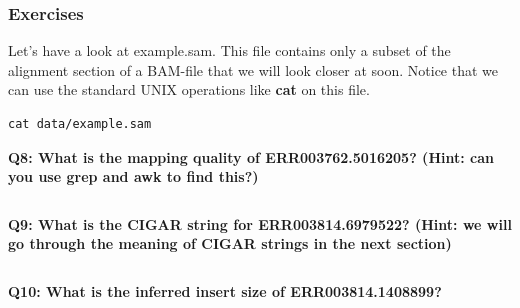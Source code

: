 \documentclass[11pt]{article}
\makeatletter
\newcommand{\boxspacing}{\kern\kvtcb@left@rule\kern\kvtcb@boxsep}
\newcommand{\prompt}[4]{
        \ttfamily\llap{{\color{#2}\LARGE\faKeyboardO\hspace{3pt}#4}}\vspace{-\baselineskip}
    }
\makeatother
\begin{document}
    \hypertarget{exercises}{%
\subsubsection{Exercises}\label{exercises}}

Let's have a look at example.sam. This file contains only a subset of
the alignment section of a BAM-file that we will look closer at soon.
Notice that we can use the standard UNIX operations like \textbf{cat} on
this file.

    \begin{tcolorbox}[breakable, size=fbox, boxrule=1pt, pad at break*=1mm,colback=cellbackground, colframe=cellborder]
\prompt{In}{incolor}{ }{\boxspacing}
\begin{Verbatim}[commandchars=\\\{\}]
cat data/example.sam
\end{Verbatim}
\end{tcolorbox}

    \textbf{Q8: What is the mapping quality of ERR003762.5016205? (Hint: can
you use grep and awk to find this?)}

    \begin{tcolorbox}[breakable, size=fbox, boxrule=1pt, pad at break*=1mm,colback=cellbackground, colframe=cellborder]
\prompt{In}{incolor}{ }{\boxspacing}
\begin{Verbatim}[commandchars=\\\{\}]

\end{Verbatim}
\end{tcolorbox}

    \textbf{Q9: What is the CIGAR string for ERR003814.6979522? (Hint: we
will go through the meaning of CIGAR strings in the next section)}

    \begin{tcolorbox}[breakable, size=fbox, boxrule=1pt, pad at break*=1mm,colback=cellbackground, colframe=cellborder]
\prompt{In}{incolor}{ }{\boxspacing}
\begin{Verbatim}[commandchars=\\\{\}]

\end{Verbatim}
\end{tcolorbox}

    \textbf{Q10: What is the inferred insert size of ERR003814.1408899?}

    \begin{tcolorbox}[breakable, size=fbox, boxrule=1pt, pad at break*=1mm,colback=cellbackground, colframe=cellborder]
\prompt{In}{incolor}{ }{\boxspacing}
\begin{Verbatim}[commandchars=\\\{\}]

\end{Verbatim}
\end{tcolorbox}
\end{document}
